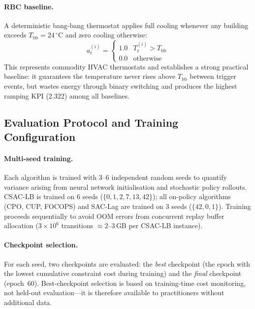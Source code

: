 \paragraph{RBC baseline.}
A deterministic bang-bang thermostat applies full cooling whenever any building
exceeds $T_{\text{bb}} = 24\,^\circ$C and zero cooling otherwise:
\begin{equation}
  a_t^{(i)} =
  \begin{cases}
    1.0 & T_t^{(i)} > T_{\text{bb}} \\
    0.0 & \text{otherwise}
  \end{cases}
  \label{eq:bangbang-rbc}
\end{equation}
This represents commodity HVAC thermostats and establishes a strong practical
baseline: it guarantees the temperature never rises above $T_{\text{bb}}$
between trigger events, but wastes energy through binary switching and produces
the highest ramping KPI (2.322) among all baselines.


\subsection{Evaluation Protocol and Training Configuration}
\label{sec:temp-eval-protocol}

\paragraph{Multi-seed training.}
Each algorithm is trained with \num{3}--\num{6} independent random seeds to
quantify variance arising from neural network initialisation and stochastic
policy rollouts.  CSAC-LB is trained on \num{6} seeds
($\{0, 1, 2, 7, 13, 42\}$); all on-policy algorithms (CPO, CUP, FOCOPS) and
SAC-Lag are trained on \num{3} seeds ($\{42, 0, 1\}$).  Training proceeds
sequentially to avoid OOM errors from concurrent replay buffer allocation
($3 \times 10^6$ transitions $\approx 2$--3\,GB per CSAC-LB instance).

\paragraph{Checkpoint selection.}
For each seed, two checkpoints are evaluated: the \emph{best} checkpoint
(the epoch with the lowest cumulative constraint cost during training) and the
\emph{final} checkpoint (epoch~60).  Best-checkpoint selection is based on
training-time cost monitoring, not held-out evaluation---it is therefore
available to practitioners without additional data.

